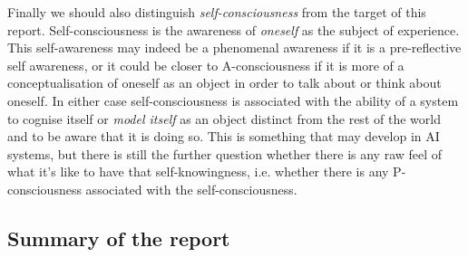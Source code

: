 \documentclass[11pt, a4paper, onecolumn, gdm]{google}
\begin{document}
Finally we should also distinguish \emph{self-consciousness} from the target of this report.
Self-consciousness is the awareness of \emph{oneself} as the subject of experience.
This self-awareness may indeed be a phenomenal awareness if it is a pre-reflective self awareness, or it could be closer to A-consciousness if it is more of a conceptualisation of oneself as an object in order to talk about or think about oneself.
In either case self-consciousness is associated with the ability of a system to cognise itself or \emph{model itself} as an object distinct from the rest of the world and to be aware that it is doing so.
This is something that may develop in AI systems, but there is still the further question whether there is any raw feel of what it's like to have that self-knowingness, i.e. whether there is any P-consciousness associated with the self-consciousness.

\subsection{Summary of the report}\label{summary-of-the-report}
\end{document}
